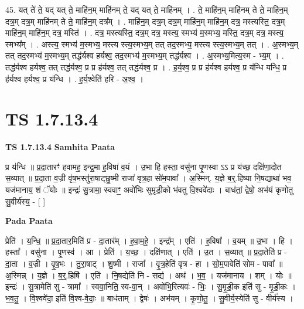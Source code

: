 \documentclass[17pt]{extarticle}
\begin{document}
45. यत् ते॑ ते॒ यद् यत् ते॒ माहि॑न॒म् माहि॑नम् ते॒ यद् यत् ते॒ माहि॑नम् । . ते॒ माहि॑न॒म् माहि॑नम् ते ते॒ माहि॑न॒म् दत्र॒म् दत्र॒म् माहि॑नम् ते ते॒ माहि॑न॒म् दत्र᳚म् । . माहि॑न॒म् दत्र॒म् दत्र॒म् माहि॑न॒म् माहि॑न॒म् दत्र॒ मस्त्यस्ति॒ दत्र॒म् माहि॑न॒म् माहि॑न॒म् दत्र॒ मस्ति॑ । . दत्र॒ मस्त्यस्ति॒ दत्र॒म् दत्र॒ मस्त्य॒ स्मभ्य॑ म॒स्मभ्य॒ मस्ति॒ दत्र॒म् दत्र॒ मस्त्य॒ स्मभ्य᳚म् । . अस्त्य॒ स्मभ्य॑ म॒स्मभ्य॒ मस्त्य स्त्य॒स्मभ्य॒म् तत् तद॒स्मभ्य॒ मस्त्य स्त्य॒स्मभ्य॒म् तत् । . अ॒स्मभ्य॒म् तत् तद॒स्मभ्य॑ म॒स्मभ्य॒म् तद्ध॑र्यश्व हर्यश्व॒ तद॒स्मभ्य॑ म॒स्मभ्य॒म् तद्ध॑र्यश्व । . अ॒स्मभ्य॒मित्य॒स्म - भ्य॒म् । . तद्ध॑र्यश्व हर्यश्व॒ तत् तद्ध॑र्यश्व॒ प्र प्र ह॑र्यश्व॒ तत् तद्ध॑र्यश्व॒ प्र । . ह॒र्य॒श्व॒ प्र प्र ह॑र्यश्व हर्यश्व॒ प्र य॑न्धि यन्धि॒ प्र ह॑र्यश्व हर्यश्व॒ प्र य॑न्धि । . ह॒र्य॒श्वेति॑ हरि - अ॒श्व॒ । \newline
\pagebreak
{}
\section*{ TS 1.7.13.4 }

\textbf{TS 1.7.13.4 } \newline
\textbf{Samhita Paata} \newline

प्र य॑न्धि ॥ प्र॒दा॒तारꣳ॑ हवामह॒ इन्द्र॒मा ह॒विषा॑ व॒यं । उ॒भा हि हस्ता॒ वसु॑ना पृ॒णस्वा ऽऽ प्र य॑च्छ॒ दक्षि॑णा॒दोत स॒व्यात् ॥ प्र॒दा॒ता व॒ज्री वृ॑ष॒भस्तु॑रा॒षाट्छु॒ष्मी राजा॑ वृत्र॒हा सो॑म॒पावा᳚ । अ॒स्मिन्. य॒ज्ञे ब॒र्॒.हिष्या नि॒षद्याथा॑ भव॒ यज॑मानाय॒ शं ॅयोः ॥ इन्द्रः॑ सु॒त्रामा॒ स्ववाꣳ॒॒ अवो॑भिः सुमृडी॒को भ॑वतु वि॒श्ववे॑दाः । बाध॑तां॒ द्वेषो॒ अभ॑यं कृणोतु सु॒वीर्य॑स्य॒ - [ ] \newline

\textbf{Pada Paata} \newline

प्रेति॑ । य॒न्धि॒ ॥ प्र॒दा॒तार॒मिति॑ प्र - दा॒तार᳚म् । ह॒वा॒म॒हे॒ । इन्द्र᳚म् । एति॑ । ह॒विषा᳚ । व॒यम् ॥ उ॒भा । हि । हस्ता᳚ । वसु॑ना । पृ॒णस्व॑ । आ । प्रेति॑ । य॒च्छ॒ । दक्षि॑णात् । एति॑ । उ॒त । स॒व्यात् ॥ प्र॒दा॒तेति॑ प्र - दा॒ता । व॒ज्री । वृ॒ष॒भः । तु॒रा॒षाट् । शु॒ष्मी । राजा᳚ । वृ॒त्र॒हेति॑ वृत्र - हा । सो॒म॒पावेति॑ सोम - पावा᳚ ॥ अ॒स्मिन्न् । य॒ज्ञे । ब॒र्॒.हिषि॑ । एति॑ । नि॒षद्येति॑ नि - सद्य॑ । अथ॑ । भ॒व॒ । यज॑मानाय । शम् । योः ॥ इन्द्रः॑ । सु॒त्रामेति॑ सु - त्रामा᳚ । स्ववा॒निति॒ स्व-वा॒न् । अवो॑भि॒रित्यवः॑ - भिः॒ । सु॒मृ॒डी॒क इति॑ सु - मृ॒डी॒कः । भ॒व॒तु॒ । वि॒श्ववे॑दा॒ इति॑ वि॒श्व-वे॒दाः॒ ॥ बाध॑ताम् । द्वेषः॑ । अभ॑यम् । कृ॒णो॒तु॒ । सु॒वीर्य॒स्येति॑ सु - वीर्य॑स्य ।  \newline
\end{document}

